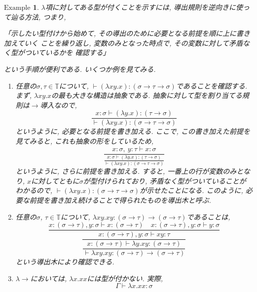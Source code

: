 \documentclass[11pt]{jsreport}
\theoremstyle{mystyle}
\newtheorem{ex}[df]{$\textrm{Example}$}
\newcommand{\T}{\mathbb{T}}
\newcommand{\lama}{\lambda \! \! \to}
\newcommand{\0}{\textbf{0}}
\begin{document}
\begin{ex}%
$\lambda$項に対してある型が付くことを示すには, 
      導出規則を逆向きに使って辿る方法, つまり, 
      
        「示したい型付けから始めて, その導出のために必要となる前提を順に上に書き加えていく
        ことを繰り返し, 変数のみとなった時点で, その変数に対して矛盾なく型がついているかを
        確認する」
        
      という手順が便利である. いくつか例を見てみる. 
  \begin{enumerate}
    \item  任意の$\sigma, \tau \in \T$について, 
      $\vdash (\lambda x y . x) \colon (\sigma \to \tau \to \sigma)$であることを確認する. 
      まず, $\lambda x y . x$の最も大きな構造は抽象である. 
      抽象に対して型を割り当てる規則は$\to$導入なので, 
      \[
        \frac{x \colon \sigma \vdash (\lambda y . x) \colon (\tau \to \sigma)}
          {\vdash (\lambda x y . x) \colon (\sigma \to \tau \to \sigma)}
      \]
        というように, 必要となる前提を書き加える. ここで, この書き加えた前提を見てみると, 
        これも抽象の形をしているため, 
      \[
        \frac{x \colon \sigma,\ y \colon \tau \vdash x \colon \sigma}
       {\displaystyle{\frac{x \colon \sigma \vdash (\lambda y . x) \colon (\tau \to \sigma)}
          {\vdash (\lambda x y . x) \colon (\sigma \to \tau \to \sigma)}}}
      \]
      というように, さらに前提を書き加える. すると, 一番上の行が変数のみとなり, 
      $x$に対してともに$\sigma$が型付けられており, 矛盾なく型がついていることがわかるので, 
      $\vdash (\lambda x y . x) \colon (\sigma \to \tau \to \sigma)$が示せたことになる. 
      このように, 必要な前提を書き加え続けることで得られたものを導出木と呼ぶ. 
      \item 任意の$\sigma$, $\tau \in \T$について, 
        $\lambda xy . xy \colon (\sigma \to \tau) \to (\sigma \to \tau)$であることは, 
        \[
      \dfrac{x \colon (\sigma \to \tau), y \colon \sigma \vdash x \colon (\sigma \to \tau)
      \quad x \colon (\sigma \to \tau), y \colon \sigma \vdash y \colon \sigma}
          {\dfrac{x \colon (\sigma \to \tau), y \colon \sigma \vdash xy \colon \tau}
          {\dfrac{x \colon (\sigma \to \tau) \vdash \lambda y . xy \colon (\sigma \to \tau)}
          {\vdash \lambda xy . xy \colon (\sigma \to \tau) \to (\sigma \to \tau)}}}
        \]
        という導出木により確認できる. 
    \item $\lama$においては, $\lambda x . xx$には型が付かない. 実際, 
    \[
      \Gamma \vdash \lambda x. xx \colon \sigma
\]
\end{enumerate}
\end{ex}
\end{document}
